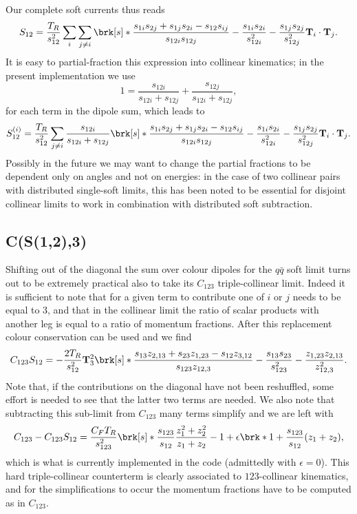 \documentclass[11pt,a4paper]{article}
\newcommand{\eps}[0]{\epsilon}
\newcommand{\colorT}[1]{\mathbf{T}_{#1}}
\begin{document}
Our complete soft currents thus reads
\begin{equation}
	S_{12} = \frac{T_R}{s_{12}^2} \sum_i \sum_{j \ne i}
	\brk[s]*{
		\frac{s_{1i}s_{2j} + s_{1j}s_{2i} - s_{12}s_{ij}}{s_{12i} s_{12j}}
		- \frac{s_{1i}s_{2i}}{s_{12i}^2} - \frac{s_{1j}s_{2j}}{s_{12j}^2}
	} \colorT{i}\cdot\colorT{j}.
\end{equation}
It is easy to partial-fraction this expression into collinear kinematics;
in the present implementation we use
\begin{equation}
	1 = \frac{s_{12i}}{s_{12i} + s_{12j}} + \frac{s_{12j}}{s_{12i} + s_{12j}},
\end{equation}
for each term in the dipole sum, which leads to
\begin{equation}
	S_{12}^{(i)} = \frac{T_R}{s_{12}^2} \sum_{j \ne i}
	\frac{s_{12i}}{s_{12i} + s_{12j}}
	\brk[s]*{
		\frac{s_{1i}s_{2j} + s_{1j}s_{2i} - s_{12}s_{ij}}{s_{12i} s_{12j}}
		- \frac{s_{1i}s_{2i}}{s_{12i}^2} - \frac{s_{1j}s_{2j}}{s_{12j}^2}
	} \colorT{i}\cdot\colorT{j}.
\end{equation}
Possibly in the future we may want to change the partial fractions
to be dependent only on angles and not on energies:
in the case of two collinear pairs with distributed single-soft limits,
this has been noted to be essential for disjoint collinear limits to work
in combination with distributed soft subtraction.


\subsection{C(S(1,2),3)}

Shifting out of the diagonal the sum over colour dipoles for the $q\bar{q}$ soft limit
turns out to be extremely practical also to take its $C_{123}$ triple-collinear limit.
Indeed it is sufficient to note that for a given term to contribute one of $i$ or $j$
needs to be equal to $3$, and that in the collinear limit
the ratio of scalar products with another leg
is equal to a ratio of momentum fractions.
After this replacement colour conservation can be used and we find
\begin{equation}
	C_{123}S_{12} = - \frac{2T_R}{s_{12}^2} \colorT{3}^2
	\brk[s]*{
		\frac{s_{13} z_{2,13} + s_{23} z_{1,23} - s_{12} z_{3,12}}
		{s_{123} z_{12,3}}
		- \frac{s_{13}s_{23}}{s_{123}^2} - \frac{z_{1,23} z_{2,13}}{z_{12,3}^2}
	}.
\end{equation}
Note that, if the contributions on the diagonal have not been reshuffled,
some effort is needed to see that the latter two terms are needed.
We also note that subtracting this sub-limit from $C_{123}$
many terms simplify and we are left with
\begin{equation}
	C_{123} - C_{123}S_{12} = \frac{C_F T_R}{s_{123}^2} \brk[s]*{
		\frac{s_{123}}{s_{12}} \frac{z_1^2 + z_2^2}{z_1+z_2} - 1
		+ \eps \brk*{1 + \frac{s_{123}}{s_{12}} (z_1+z_2) }
	},
\end{equation}
which is what is currently implemented in the code (admittedly with $\eps=0$).
This hard triple-collinear counterterm is clearly associated
to $123$-collinear kinematics, and for the simplifications to occur
the momentum fractions have to be computed as in $C_{123}$.
\end{document}
